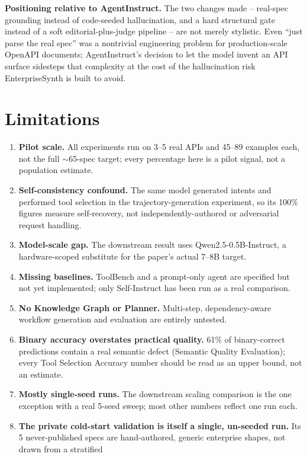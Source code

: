 \documentclass[letterpaper]{article} %
\begin{document}
\textbf{Positioning relative to AgentInstruct.} The two changes made -- real-spec grounding instead
of code-seeded hallucination, and a hard structural gate instead of a soft editorial-plus-judge
pipeline -- are not merely stylistic. Even ``just parse the real spec'' was a nontrivial
engineering problem for production-scale OpenAPI documents; AgentInstruct's decision to let the
model invent an API surface sidesteps that complexity at the cost of the hallucination risk
EnterpriseSynth is built to avoid.

\section{Limitations}
\begin{enumerate}
    \item \textbf{Pilot scale.} All experiments run on 3--5 real APIs and 45--89 examples each,
    not the full $\sim$65-spec target; every percentage here is a pilot signal, not a population
    estimate.
    \item \textbf{Self-consistency confound.} The same model generated intents and performed tool
    selection in the trajectory-generation experiment, so its 100\% figures measure self-recovery,
    not independently-authored or adversarial request handling.
    \item \textbf{Model-scale gap.} The downstream result uses Qwen2.5-0.5B-Instruct, a
    hardware-scoped substitute for the paper's actual 7--8B target.
    \item \textbf{Missing baselines.} ToolBench and a prompt-only agent are specified but not yet
    implemented; only Self-Instruct has been run as a real comparison.
    \item \textbf{No Knowledge Graph or Planner.} Multi-step, dependency-aware workflow generation
    and evaluation are entirely untested.
    \item \textbf{Binary accuracy overstates practical quality.} 61\% of binary-correct predictions
    contain a real semantic defect (Semantic Quality Evaluation); every Tool Selection Accuracy
    number should be read as an upper bound, not an estimate.
    \item \textbf{Mostly single-seed runs.} The downstream scaling comparison is the one exception
    with a real 5-seed sweep; most other numbers reflect one run each.
    \item \textbf{The private cold-start validation is itself a single, un-seeded run.} Its 5
    never-published specs are hand-authored, generic enterprise shapes, not drawn from a stratified

\end{enumerate}
\end{document}

